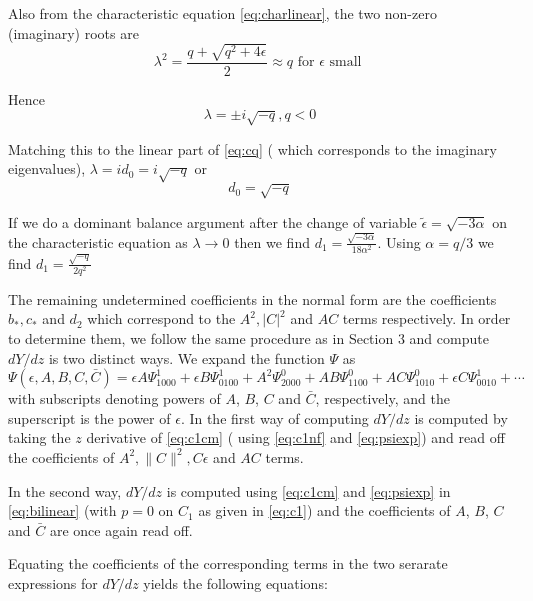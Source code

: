 Also from the characteristic equation \eqref{eq:charlinear}, the two non-zero 
(imaginary) roots are 
\begin{equation}
\lambda^2 = \frac{ q + \sqrt{q^2 + 4 \epsilon } }{2} \approx q \textrm{ for } \epsilon \textrm{ small }
\end{equation}

Hence
\begin{equation}
\lambda = \pm i \sqrt{-q}, q < 0
\end{equation}

Matching this to the linear part of \eqref{eq:cq} ( which corresponds to the imaginary eigenvalues), $\lambda = i d_0 = i \sqrt{-q}$ or 
\begin{equation}
d_0 = \sqrt{-q}
\end{equation}


If we do a dominant balance argument after the change of variable $\tilde{\epsilon} = \sqrt{-3 \alpha}$ on the characteristic equation as $\lambda \rightarrow 0 $ then we find $d_1 = \frac{ \sqrt{-3 \alpha} }{18 \alpha^2 } $. Using $\alpha=q/3$ we find $d_1 = \frac{\sqrt{-q}}{2 q^2} $ 

The remaining undetermined coefficients  in the normal form are the 
coefficients $b_*,c_*$ and $d_2$ 
which correspond to the $A^2, |C|^2$ and $AC$ terms respectively. In 
order to determine them, we follow the same procedure as 
in Section 3 and compute $dY/dz$ is two distinct ways. We expand the
function $\Psi$ as
\begin{equation}\label{eq:psiexp}
\Psi(\epsilon,A,B,C,\bar{C}) = \epsilon A \Psi_{1000}^1 + \epsilon B \Psi_{0100}^1 + A^2 \Psi_{2000}^0 + A B \Psi_{1100}^0 + A C \Psi_{1010}^0 + \epsilon C \Psi_{0010}^1 + \cdots 
\end{equation}
with subscripts denoting powers of $A$, $B$, $C$ and $\bar{C}$, respectively,
and the superscript is the power of $\epsilon$. In the first way of computing
$dY/dz$ is computed by taking the $z$ derivative of \eqref{eq:c1cm} ( 
using \eqref{eq:c1nf} and \eqref{eq:psiexp}) and read off the coefficients
of $A^2, \|C\|^2, C \epsilon$ and $AC$ terms.

In the second way, $dY/dz$ is computed using 
\eqref{eq:c1cm} and \eqref{eq:psiexp} in \eqref{eq:bilinear} 
(with $p=0$ on $C_1$ as given in \eqref{eq:c1})
and the coefficients of  $A$, $B$, $C$ and $\bar{C}$ are once
again read off.

Equating the coefficients of the corresponding terms in the two
serarate expressions for $dY/dz$ yields the following equations:

